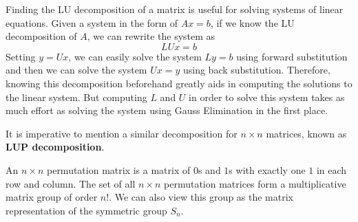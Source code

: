   Finding the LU decomposition of a matrix is useful for solving systems of linear equations. Given a system in the form of $A x = b$, if we know the LU decomposition of $A$, we can rewrite the system as 
  \begin{equation}
    L U x = b
  \end{equation}
  Setting $y = U x$, we can easily solve the system $L y = b$ using forward substitution and then we can solve the system $U x = y$ using back substitution. Therefore, knowing this decomposition beforehand greatly aids in computing the solutions to the linear system. But computing $L$ and $U$ in order to solve this system takes as much effort as solving the system using Gauss Elimination in the first place. 

  It is imperative to mention a similar decomposition for $n \times n$ matrices, known as \textbf{LUP decomposition}. 

  \begin{definition}
    \label{def:permutation-matrix}
    An $n \times n$ permutation matrix is a matrix of $0$s and $1$s with exactly one $1$ in each row and column. The set of all $n \times n$ permutation matrices form a multiplicative matrix group of order $n!$. We can also view this group as the matrix representation of the symmetric group $S_n$. 
  \end{definition}

